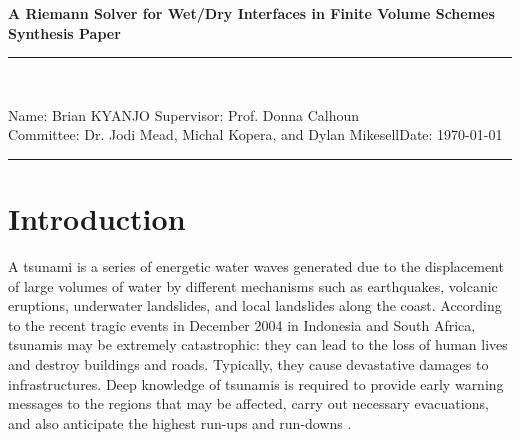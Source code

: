 \documentclass[10pt,a4paper]{article}
\newcommand{\student}{Brian KYANJO }
\newcommand{\course}{Dr. Jodi Mead, Michal Kopera, and Dylan Mikesell}
\newcommand{\assignment}{ Prof. Donna Calhoun}
\begin{document}
	
	\thispagestyle{empty}
	\begin{center}
		\textbf{A Riemann Solver for Wet/Dry Interfaces in Finite Volume Schemes\\[0.5cm]
			Synthesis Paper}
		\vspace{.2cm}
	\end{center}
	
	
	\begin{center}
		\rule{17cm}{0.2cm}\\[0.3cm]
	\end{center}	
	
	\noindent	Name: \student \hfill Supervisor: \assignment\\[0.1cm]
	Committee: \course \hfill Date: \today\\
	\rule{17cm}{0.05cm}
	\vspace{.2cm}
	
	\section{Introduction}
	
				A tsunami is a series of energetic water waves generated due to the displacement of large volumes of water by different mechanisms such as earthquakes, volcanic eruptions, underwater landslides, and local landslides along the coast. According to the recent tragic events in December 2004 in Indonesia and  South Africa, tsunamis may be extremely catastrophic: they can lead to the loss of human lives and destroy buildings and roads. Typically, they cause devastative damages to infrastructures. Deep knowledge of tsunamis is required to provide early warning messages to the regions that may be affected, carry out necessary evacuations, and also anticipate the highest run-ups and run-downs    \cite{sanchez2016uncertainty,dutykh2007water,dias2007dynamics}.
				
\end{document}
